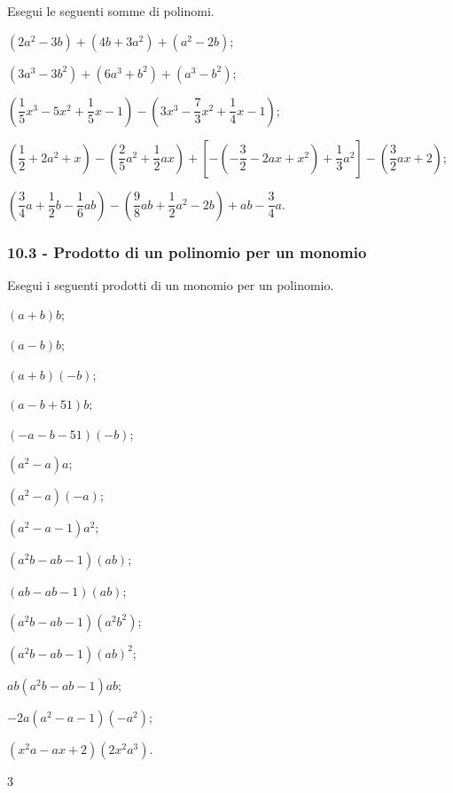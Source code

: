 \begin{esercizio}[\Ast]
\label{ese:10.14}
 Esegui le seguenti somme di polinomi.

 \begin{enumeratea}
 \item $\left(2a^{2}-3b\right)+\left(4b+3a^{2}\right)+\left(a^{2}-2b\right)$;
 \item $\left(3a^{3}-3b^{2}\right)+\left(6a^{3}+b^{2}\right)+\left(a^{3}-b^{2}\right)$;
 \item $\left(\dfrac{1}{5}x^{3}-5x^{2}+\dfrac{1}{5}x-1\right)-\left(3x^{3}-\dfrac{7}{3}x^{2}+\dfrac{1}{4}x-1\right)$;
 \item $\left(\dfrac{1}{2}+2a^{2}+x\right)-\left(\dfrac{2}{5}a^{2}+\dfrac{1}{2}{ax}\right)+\left[-\left(-{\dfrac{3}{2}}-2{ax}+x^{2}\right)+\dfrac{1}{3}a^{2}\right]-\left(\dfrac{3}{2}{ax}+2\right)$;
 \item $\left(\dfrac{3}{4}a+\dfrac{1}{2}b-\dfrac{1}{6}{ab}\right)-\left(\dfrac{9}{8}{ab}+\dfrac{1}{2}a^{2}-2b\right)+{ab}-\dfrac{3}{4}a$.
\end{enumeratea}
\end{esercizio}

\subsubsection*{10.3 - Prodotto di un polinomio per un monomio}

\begin{esercizio}
\label{ese:10.15}
 Esegui i seguenti prodotti di un monomio per un polinomio.
 \begin{multicols}{3}
\begin{enumeratea}
 \item $(a + b)b$;
 \item $(a - b)b$;
 \item $(a +b)(-b)$;
 \item $(a - b + 51)b$;
 \item $(-a - b -51)(-b)$;
 \item $(a^{2} - a)a$;
 \item $(a^{2} - a)(-a)$;
 \item $(a^{2}- a - 1)a^{2}$;
 \item $(a^{2}b-ab - 1)(ab)$;
 \item $(ab- ab - 1)(ab)$;
 \item $(a^{2}b- ab -1)(a^{2}b^{2})$;
 \item $(a^{2}b-ab - 1)(ab)^{2}$;
 \item $ab(a^{2}b- ab -1)ab$;
 \item $-2a(a^{2} - a - 1)(-a^{2})$;
 \item $(x^{2}a- ax+2)(2x^{2}a^{3})$.
\end{enumeratea}
\end{multicols}
\end{esercizio}3

